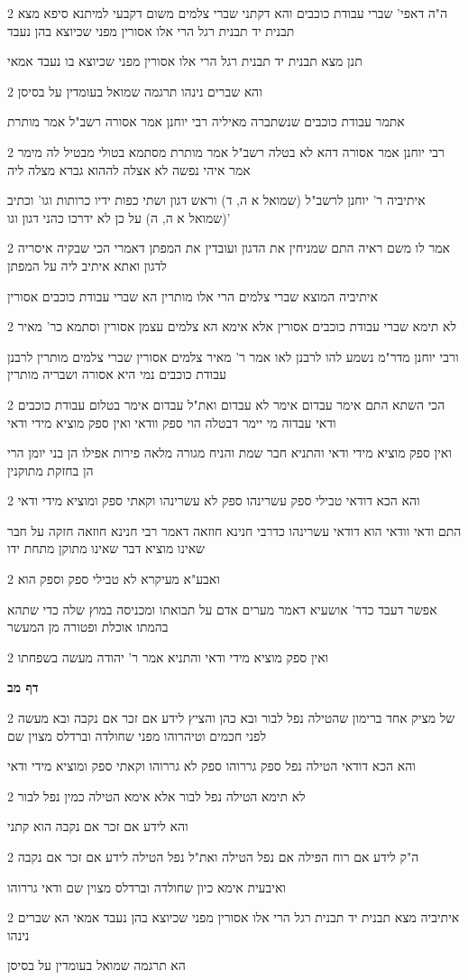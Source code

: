\documentclass[12pt, openany]{book}
\newcommand{\sethebfont}{
\fontsize{10.5pt}{21.0pt} \selectfont
}
\newcommand{\twocol}[1]{
	{\sethebfont \begin{multicols}{2}
			#1
	\end{multicols}}	
}
\newcommand{\sectname}{}
\newcommand{\newsection}[1]{
	\addcontentsline{toc}{section}{#1}
	\renewcommand{\sectname}{#1}	
	\vspace{-\baselineskip}
	\begin{center}
		\textbf{%
\fontsize{16pt}{16pt}\selectfont
			#1}
	\end{center}
	\vspace{-\baselineskip}
	\nopagebreak
}
\begin{document}
\twocol{ה"ה דאפי' שברי עבודת כוכבים והא דקתני שברי צלמים משום דקבעי למיתנא סיפא מצא תבנית יד תבנית רגל הרי אלו אסורין מפני שכיוצא בהן נעבד
\par תנן מצא תבנית יד תבנית רגל הרי אלו אסורין מפני שכיוצא בו נעבד אמאי}
\twocol{והא שברים נינהו תרגמה שמואל בעומדין על בסיסן
\par אתמר עבודת כוכבים שנשתברה מאיליה רבי יוחנן אמר אסורה רשב"ל אמר מותרת}
\twocol{רבי יוחנן אמר אסורה דהא לא בטלה רשב"ל אמר מותרת מסתמא בטולי מבטיל לה מימר אמר איהי נפשה לא אצלה לההוא גברא מצלה ליה
\par איתיביה ר' יוחנן לרשב"ל (שמואל א ה, ד) וראש דגון ושתי כפות ידיו כרותות וגו' וכתיב (שמואל א ה, ה) על כן לא ידרכו כהני דגון וגו'}
\twocol{אמר לו משם ראיה התם שמניחין את הדגון ועובדין את המפתן דאמרי הכי שבקיה איסריה לדגון ואתא איתיב ליה על המפתן
\par איתיביה המוצא שברי צלמים הרי אלו מותרין הא שברי עבודת כוכבים אסורין}
\twocol{לא תימא שברי עבודת כוכבים אסורין אלא אימא הא צלמים עצמן אסורין וסתמא כר' מאיר
\par ורבי יוחנן מדר"מ נשמע להו לרבנן לאו אמר ר' מאיר צלמים אסורין שברי צלמים מותרין לרבנן עבודת כוכבים נמי היא אסורה ושבריה מותרין}
\twocol{הכי השתא התם אימר עבדום אימר לא עבדום ואת"ל עבדום אימר בטלום עבודת כוכבים ודאי עבדוה מי יימר דבטלה הוי ספק וודאי ואין ספק מוציא מידי ודאי
\par ואין ספק מוציא מידי ודאי והתניא חבר שמת והניח מגורה מלאה פירות אפילו הן בני יומן הרי הן בחזקת מתוקנין}
\twocol{והא הכא דודאי טבילי ספק עשרינהו ספק לא עשרינהו וקאתי ספק ומוציא מידי ודאי
\par התם ודאי וודאי הוא דודאי עשרינהו כדרבי חנינא חוזאה דאמר רבי חנינא חוזאה חזקה על חבר שאינו מוציא דבר שאינו מתוקן מתחת ידו}
\twocol{ואבע"א מעיקרא לא טבילי ספק וספק הוא
\par אפשר דעבד כדר' אושעיא דאמר מערים אדם על תבואתו ומכניסה במוץ שלה כדי שתהא בהמתו אוכלת ופטורה מן המעשר}
\twocol{ואין ספק מוציא מידי ודאי והתניא אמר ר' יהודה מעשה בשפחתו}
\newsection{דף מב}
\twocol{של מציק אחד ברימון שהטילה נפל לבור ובא כהן והציץ לידע אם זכר אם נקבה ובא מעשה לפני חכמים וטיהרוהו מפני שחולדה וברדלס מצוין שם
\par והא הכא דודאי הטילה נפל ספק גררוהו ספק לא גררוהו וקאתי ספק ומוציא מידי ודאי}
\twocol{לא תימא הטילה נפל לבור אלא אימא הטילה כמין נפל לבור
\par והא לידע אם זכר אם נקבה הוא קתני}
\twocol{ה"ק לידע אם רוח הפילה אם נפל הטילה ואת"ל נפל הטילה לידע אם זכר אם נקבה
\par ואיבעית אימא כיון שחולדה וברדלס מצוין שם ודאי גררוהו}
\twocol{איתיביה מצא תבנית יד תבנית רגל הרי אלו אסורין מפני שכיוצא בהן נעבד אמאי הא שברים נינהו
\par הא תרגמה שמואל בעומדין על בסיסן}
\end{document}
